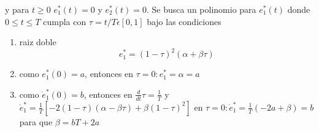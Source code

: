 y para $t \geq 0$ $e_1^*(t)=0$ y $e_2^*(t)=0$. Se busca un polinomio para $e_1^*(t)$ donde $0 \leq t \leq T$ cumpla con $\tau = t/T\epsilon [0,1]$ bajo las condiciones

\begin{enumerate}
    \item raiz doble \\
        \begin{equation*}
            e_1^* = (1-\tau)^2(\alpha+\beta \tau)
    \end{equation*}

    \item como $e_1^*(0)=a$, entonces en $\tau=0:e_1^*=\alpha=a$
    
    \item como $\dot{e}_1^*(0)=b$, entonces en $\frac{d}{dt}\tau=\frac{1}{T}$ y $\dot{e}_1^*=\frac{1}{T}[-2(1-\tau)(\alpha-\beta \tau)+\beta(1-\tau)^2]$ en $\tau=0:\dot{e}_1^*=\frac{1}{T}(-2a+\beta)=b$ para que $\beta=bT+2a$
        
\end{enumerate}
 